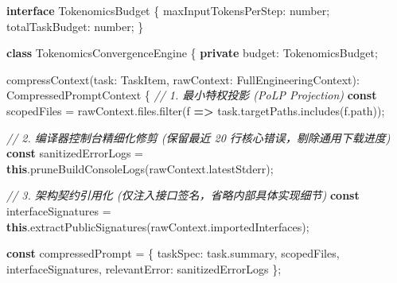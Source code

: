 \documentclass[
]{ctexart}
\newenvironment{Shaded}{}{}
\newcommand{\AttributeTok}[1]{\textcolor[rgb]{0.49,0.56,0.16}{#1}}
\newcommand{\CommentTok}[1]{\textcolor[rgb]{0.38,0.63,0.69}{\textit{#1}}}
\newcommand{\DataTypeTok}[1]{\textcolor[rgb]{0.56,0.13,0.00}{#1}}
\newcommand{\FunctionTok}[1]{\textcolor[rgb]{0.02,0.16,0.49}{#1}}
\newcommand{\KeywordTok}[1]{\textcolor[rgb]{0.00,0.44,0.13}{\textbf{#1}}}
\newcommand{\NormalTok}[1]{#1}
\newcommand{\OperatorTok}[1]{\textcolor[rgb]{0.40,0.40,0.40}{#1}}
\renewcommand{\_}{\discretionary{}{}{\textunderscore}}
\begin{document}
\begin{Shaded}
\begin{Highlighting}[]
\KeywordTok{interface}\NormalTok{ TokenomicsBudget \{}
\NormalTok{  maxInputTokensPerStep}\OperatorTok{:} \DataTypeTok{number}\OperatorTok{;}
\NormalTok{  totalTaskBudget}\OperatorTok{:} \DataTypeTok{number}\OperatorTok{;}
\NormalTok{\}}

\KeywordTok{class}\NormalTok{ TokenomicsConvergenceEngine \{}
  \KeywordTok{private}\NormalTok{ budget}\OperatorTok{:}\NormalTok{ TokenomicsBudget}\OperatorTok{;}

  \FunctionTok{compressContext}\NormalTok{(task}\OperatorTok{:}\NormalTok{ TaskItem}\OperatorTok{,}\NormalTok{ rawContext}\OperatorTok{:}\NormalTok{ FullEngineeringContext)}\OperatorTok{:}\NormalTok{ CompressedPromptContext \{}
    \CommentTok{// 1. 最小特权投影 (PoLP Projection)}
    \KeywordTok{const}\NormalTok{ scopedFiles }\OperatorTok{=}\NormalTok{ rawContext}\OperatorTok{.}\AttributeTok{files}\OperatorTok{.}\FunctionTok{filter}\NormalTok{(f }\KeywordTok{=\textgreater{}}\NormalTok{ task}\OperatorTok{.}\AttributeTok{targetPaths}\OperatorTok{.}\FunctionTok{includes}\NormalTok{(f}\OperatorTok{.}\AttributeTok{path}\NormalTok{))}\OperatorTok{;}
    
    \CommentTok{// 2. 编译器控制台精细化修剪 (保留最近 20 行核心错误，剔除通用下载进度)}
    \KeywordTok{const}\NormalTok{ sanitizedErrorLogs }\OperatorTok{=} \KeywordTok{this}\OperatorTok{.}\FunctionTok{pruneBuildConsoleLogs}\NormalTok{(rawContext}\OperatorTok{.}\AttributeTok{latestStderr}\NormalTok{)}\OperatorTok{;}

    \CommentTok{// 3. 架构契约引用化 (仅注入接口签名，省略内部具体实现细节)}
    \KeywordTok{const}\NormalTok{ interfaceSignatures }\OperatorTok{=} \KeywordTok{this}\OperatorTok{.}\FunctionTok{extractPublicSignatures}\NormalTok{(rawContext}\OperatorTok{.}\AttributeTok{importedInterfaces}\NormalTok{)}\OperatorTok{;}

    \KeywordTok{const}\NormalTok{ compressedPrompt }\OperatorTok{=}\NormalTok{ \{}
\NormalTok{      taskSpec}\OperatorTok{:}\NormalTok{ task}\OperatorTok{.}\AttributeTok{summary}\OperatorTok{,}
\NormalTok{      scopedFiles}\OperatorTok{,}
\NormalTok{      interfaceSignatures}\OperatorTok{,}
\NormalTok{      relevantError}\OperatorTok{:}\NormalTok{ sanitizedErrorLogs}
\NormalTok{    \}}\OperatorTok{;}


\end{Highlighting}
\end{Shaded}
\end{document}
